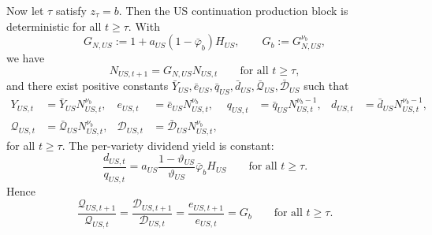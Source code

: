 \documentclass{article}
\begin{document}
\begin{prop}
Now let $\tau$ satisfy $z_\tau=b$. Then the US continuation production block is deterministic for all $t\ge \tau$. With
\[
G_{N,US}:=1+a_{US}(1-\bar\varphi_b)H_{US},
\qquad
G_b:=G_{N,US}^{\nu_b},
\]
we have
\begin{equation}\label{bg_us_knowledge_growth}
N_{US,t+1}=G_{N,US}N_{US,t}
\qquad\text{for all }t\ge \tau,
\end{equation}
and there exist positive constants
$\bar Y_{US},\bar e_{US},\bar q_{US},\bar d_{US},\bar{\mathcal Q}_{US},\bar{\mathcal D}_{US}$
such that
\begin{align}
Y_{US,t}&=\bar Y_{US}N_{US,t}^{\nu_b},
&
e_{US,t}&=\bar e_{US}N_{US,t}^{\nu_b},
&
q_{US,t}&=\bar q_{US}N_{US,t}^{\nu_b-1},
&
d_{US,t}&=\bar d_{US}N_{US,t}^{\nu_b-1},
\label{bg_us_per_variety_scaling}\\
\mathcal Q_{US,t}&=\bar{\mathcal Q}_{US}N_{US,t}^{\nu_b},
&
\mathcal D_{US,t}&=\bar{\mathcal D}_{US}N_{US,t}^{\nu_b},
\label{bg_us_scaling}
\end{align}
for all $t\ge \tau$. The per-variety dividend yield is constant:
\begin{equation}\label{bg_us_dividend_yield}
\frac{d_{US,t}}{q_{US,t}}
=
a_{US}\frac{1-\vartheta_{US}}{\vartheta_{US}}\bar\varphi_b H_{US}
\qquad\text{for all }t\ge \tau.
\end{equation}
Hence
\begin{equation}\label{bg_us_growth_rate}
\frac{\mathcal Q_{US,t+1}}{\mathcal Q_{US,t}}
=
\frac{\mathcal D_{US,t+1}}{\mathcal D_{US,t}}
=
\frac{e_{US,t+1}}{e_{US,t}}
=
G_b
\qquad\text{for all }t\ge \tau.
\end{equation}
\end{prop}
\end{document}
